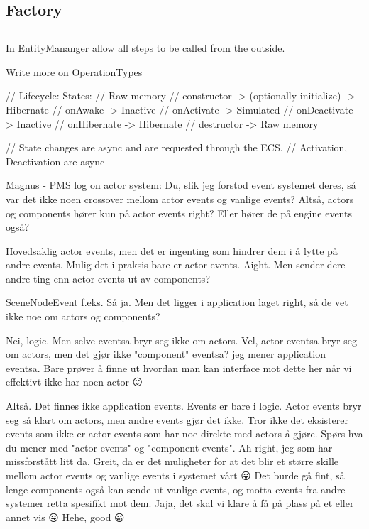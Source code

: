 \subsection{Factory}

\subsection{}

In EntityMananger allow all steps to be called from the outside.

Write more on OperationTypes

    // Lifecycle:                                   States:
    //                                              Raw memory 
    // constructor -> (optionally initialize) ->    Hibernate 
    // onAwake ->                                   Inactive
    // onActivate ->                                Simulated
    // onDeactivate ->                              Inactive
    // onHibernate ->                               Hibernate
    // destructor ->                                Raw memory

    // State changes are async and are requested through the ECS.
    // Activation, Deactivation are async

Magnus - PMS log on actor system:
Du, slik jeg forstod event systemet deres, så var det ikke noen crossover mellom actor events og vanlige events?
Altså, actors og components hører kun på actor events right? Eller hører de på engine events også?

Hovedsaklig actor events, men det er ingenting som hindrer dem i å lytte på andre events. Mulig det i praksis bare er actor events.
Aight. Men sender dere andre ting enn actor events ut av components?

SceneNodeEvent f.eks.
Så ja.
Men det ligger i application laget right, så de vet ikke noe om actors og components?

Nei, logic. Men selve eventsa bryr seg ikke om actors.
Vel, actor eventsa bryr seg om actors, men det gjør ikke "component" eventsa?
jeg mener application eventsa.
Bare prøver å finne ut hvordan man kan interface mot dette her når vi effektivt ikke har noen actor 😛

Altså. Det finnes ikke application events. Events er bare i logic. Actor events bryr seg så klart om actors, men andre events gjør det ikke. Tror ikke det eksisterer events som ikke er actor events som har noe direkte med actors å  gjøre. Spørs hva du mener med "actor events" og "component events".
Ah right, jeg som har missforstått litt da.
Greit, da er det muligheter for at det blir et større skille mellom actor events og vanlige events i systemet vårt 😛
Det burde gå fint, så lenge components også kan sende ut vanlige events, og motta events fra andre systemer retta spesifikt mot dem.
Jaja, det skal vi klare å få på plass på et eller annet vis 😛
Hehe, good 😀


